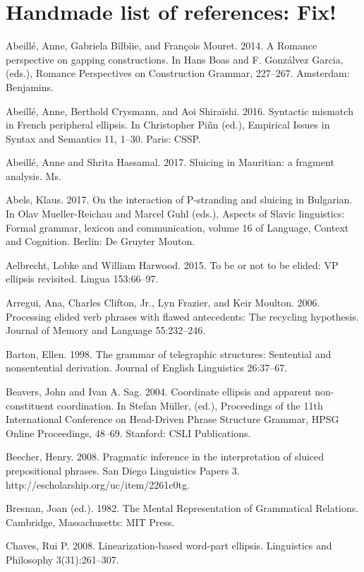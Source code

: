 \documentclass[output=paper]{langsci/langscibook}
\begin{document}
\section{Handmade list of references: Fix!}
\begin{description}
\item Abeill\'{e}, Anne, Gabriela B\^{i}lb\^{i}ie, and Fran\c{c}ois Mouret. 2014. A Romance perspective on
gapping constructions. In Hans Boas and F. Gonz\'{a}lvez Garcia, (eds.), Romance Perspectives
on Construction Grammar, 227--267. Amsterdam: Benjamins.
\item Abeill\'{e}, Anne, Berthold Crysmann, and Aoi Shira\"{i}shi. 2016. Syntactic mismatch in French peripheral ellipsis. In Christopher Pi\~{n}n (ed.), Empirical Issues in Syntax and Semantics 11, 1--30. Paris: CSSP.
\item Abeill\'{e}, Anne and Shrita Hassamal. 2017. Sluicing in Mauritian: a fragment analysis. Ms.
\item Abels, Klaus. 2017. On the interaction of P-stranding and sluicing in Bulgarian. In Olav Mueller-Reichau and Marcel Guhl (eds.), Aspects of Slavic linguistics: Formal grammar, lexicon and communication, volume 16 of Language, Context and Cognition. Berlin: De Gruyter Mouton.
\item Aelbrecht, Lobke and William Harwood. 2015. To be or not to be elided: VP ellipsis revisited. Lingua 153:66--97.
\item Arregui, Ana, Charles Clifton, Jr., Lyn Frazier, and Keir Moulton. 2006. Processing elided
verb phrases with flawed antecedents: The recycling hypothesis. Journal of Memory and
Language 55:232--246.
\item Barton, Ellen. 1998. The grammar of telegraphic structures: Sentential and nonsentential derivation. Journal of English Linguistics 26:37--67.
\item Beavers, John and Ivan A. Sag. 2004. Coordinate ellipsis and apparent non-constituent
coordination. In Stefan M\"{u}ller, (ed.), Proceedings of the 11th International Conference on
Head-Driven Phrase Structure Grammar, HPSG Online Proceedings, 48--69. Stanford: CSLI Publications.
\item Beecher, Henry. 2008. Pragmatic inference in the interpretation of sluiced prepositional
phrases. San Diego Linguistics Papers 3. http://escholarship.org/uc/item/2261c0tg.
\item Bresnan, Joan (ed.). 1982. The Mental Representation of Grammatical Relations. Cambridge, Massachusetts: MIT Press.
\item Chaves, Rui P. 2008. Linearization-based word-part ellipsis. Linguistics and Philosophy 3(31):261--307.

\end{description}
\end{document}
